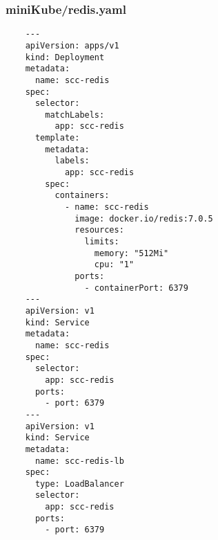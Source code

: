\documentclass[runningheads]{llncs}
\begin{document}
\subsubsection{miniKube/redis.yaml}
\begin{verbatim}
    ---
    apiVersion: apps/v1
    kind: Deployment
    metadata:
      name: scc-redis
    spec:
      selector:
        matchLabels:
          app: scc-redis
      template:
        metadata:
          labels:
            app: scc-redis
        spec:
          containers:
            - name: scc-redis
              image: docker.io/redis:7.0.5
              resources:
                limits:
                  memory: "512Mi"
                  cpu: "1"
              ports:
                - containerPort: 6379
    ---
    apiVersion: v1
    kind: Service
    metadata:
      name: scc-redis
    spec:
      selector:
        app: scc-redis
      ports:
        - port: 6379
    ---
    apiVersion: v1
    kind: Service
    metadata:
      name: scc-redis-lb
    spec:
      type: LoadBalancer
      selector:
        app: scc-redis
      ports:
        - port: 6379
\end{verbatim}
\end{document}
